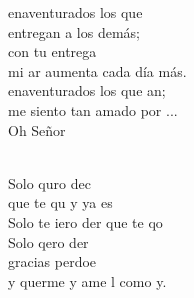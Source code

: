 \documentclass[12pt]{article}
\begin{document}
\begin{multicols*}{2}
\begin{cancion}
	enaventurados los que \\
	 entregan a los demás;\\
	con tu entrega \\
	mi ar aumenta cada día más.\\
	enaventurados los que an;\\
	 me siento tan amado por ...\\
	Oh Señor  \\\jump\\
	\begin{chorus}%
	Solo quro dec\\
	que te qu y ya es\\
	Solo te iero der que te qo\\
	Solo qero der\\
	gracias perdoe\\
	y querme y ame l como y.\\
	\end{chorus}%
	\jump\\
\end{cancion}%


\end{multicols*}
\end{document}
